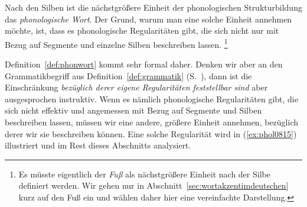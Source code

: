 \label{sec:einsilblerzweisilbler}


Nach den Silben ist die nächstgrößere Einheit der phonologischen Strukturbildung das \textit{phonologische Wort}.
Der Grund, warum man eine solche Einheit annehmen möchte, ist, dass es phonologische Regularitäten gibt, die sich nicht nur mit Bezug auf Segmente und einzelne Silben beschreiben lassen.%
\footnote{Es müsste eigentlich der \textit{Fuß} als nächstgrößere Einheit nach der Silbe definiert werden.
Wir gehen nur in Abschnitt~\ref{sec:wortakzentimdeutschen} kurz auf den Fuß ein und wählen daher hier eine vereinfachte Darstellung.}


Definition~\ref{def:phonwort} kommt sehr formal daher.
Denken wir aber an den Grammatikbegriff aus Definition~\ref{def:grammatik} (S.~\pageref{def:grammatik}), dann ist die Einschränkung \textit{bezüglich derer eigene Regularitäten feststellbar sind} aber ausgesprochen instruktiv.
Wenn es nämlich phonologische Regularitäten gibt, die sich nicht effektiv und angemessen mit Bezug auf Segmente und Silben beschreiben lassen, müssen wir eine andere, größere Einheit annehmen, bezüglich derer wir sie beschreiben können.
Eine solche Regularität wird in (\ref{ex:phol0815}) illustriert und im Rest dieses Abschnitts analysiert.

\begin{exe}
  \ex\label{ex:phol0815}
  \begin{xlist}
  	\ex{\label{ex:phol0815b} *\textipa{[knI]}}
  	\ex{\label{ex:phol0815f} *\textipa{[vi:Nk]}}
  	\ex{\label{ex:phol0815k} *\textipa{[v\t{i5}k.t@]}}
  \end{xlist}
\end{exe}

